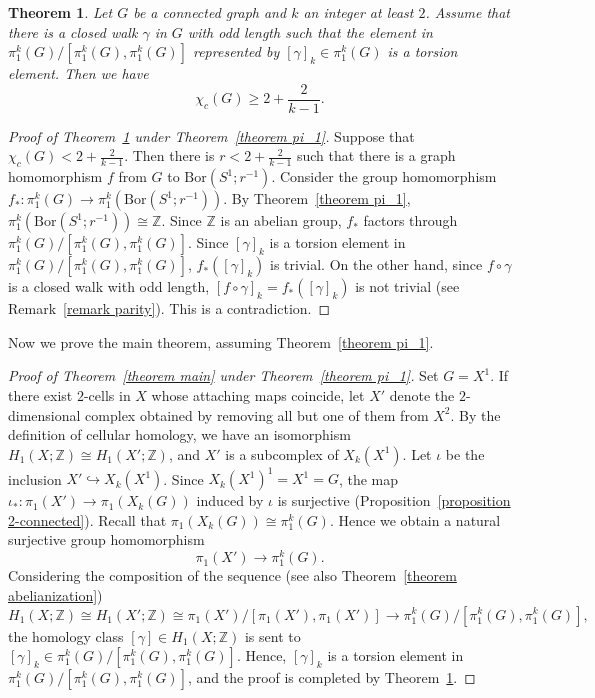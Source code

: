 \documentclass[11pt, amsfonts]{amsart}
\numberwithin{equation}{section}
\newtheorem{theorem}[thm]{Theorem}
\theoremstyle{definition}
\theoremstyle{remark}
\newcommand{\ZZ}{\mathbb{Z}}
\newcommand{\Bor}{\mathrm{Bor}}
\begin{document}
\begin{theorem} \label{theorem circular 1}
Let $G$ be a connected graph and $k$ an integer at least $2$. Assume that there is a closed walk $\gamma$ in $G$ with odd length such that the element in $\pi_1^k(G) / [\pi_1^k(G), \pi_1^k(G)]$ represented by $[\gamma]_k \in \pi_1^k(G)$ is a torsion element. Then we have
\[ \chi_c(G) \ge 2 + \frac{2}{k-1}.\]
\end{theorem}
\begin{proof}[Proof of Theorem~\ref{theorem circular 1} under Theorem~\ref{theorem pi_1}]
Suppose that $\chi_c(G) < 2 + \frac{2}{k-1}$. Then there is $r < 2 + \frac{2}{k-1}$ such that there is a graph homomorphism $f$ from $G$ to $\Bor(S^1 ; r^{-1})$. Consider the group homomorphism $f_* \colon \pi_1^k(G) \to \pi_1^k(\Bor(S^1; r^{-1}))$. By Theorem~\ref{theorem pi_1}, $\pi_1^k(\Bor(S^1; r^{-1})) \cong \ZZ$. Since $\ZZ$ is an abelian group, $f_*$ factors through $\pi_1^k(G) / [\pi_1^k(G), \pi_1^k(G)]$. Since $[\gamma]_k$ is a torsion element in $\pi_1^k(G) / [\pi_1^k(G), \pi_1^k(G)]$, $f_*([\gamma]_k)$ is trivial. On the other hand, since $f \circ \gamma$ is a closed walk with odd length, $[f \circ \gamma]_k = f_* ([\gamma]_k)$ is not trivial (see Remark~\ref{remark parity}). This is a contradiction.
\end{proof}

Now we prove the main theorem, assuming Theorem~\ref{theorem pi_1}.

\begin{proof}[Proof of Theorem~\ref{theorem main} under Theorem~\ref{theorem pi_1}]
Set $G = X^1$. If there exist $2$-cells in $X$ whose attaching maps coincide, let $X'$ denote the $2$-dimensional complex obtained by removing all but one of them from $X^2$. By the definition of cellular homology, we have an isomorphism $H_1(X; \mathbb{Z}) \cong H_1(X'; \mathbb{Z})$, and $X'$ is a subcomplex of $X_k(X^1)$.
Let $\iota$ be the inclusion $X' \hookrightarrow X_k(X^1)$.
Since $X_k(X^1)^1 = X^1 = G$, the map $\iota_* \colon \pi_1(X') \to \pi_1(X_k(G))$ induced by $\iota$ is surjective (Proposition~\ref{proposition 2-connected}).
Recall that $\pi_1(X_k(G)) \cong \pi_1^k(G)$. Hence we obtain a natural surjective group homomorphism
\[ \pi_1(X') \to \pi_1^k(G).\]
Considering the composition of the sequence (see also Theorem~\ref{theorem abelianization})
\[
H_1(X; \mathbb{Z}) \cong H_1(X'; \ZZ) \cong \pi_1(X') / [\pi_1(X'), \pi_1(X')] \to \pi_1^k(G) / [\pi_1^k(G), \pi_1^k(G)],
\]
the homology class $[\gamma] \in H_1(X; \mathbb{Z})$ is sent to \([\gamma]_k \in \pi_1^k(G) / [\pi_1^k(G), \pi_1^k(G)]\).
Hence, \([\gamma]_k\) is a torsion element in \(\pi_1^k(G) / [\pi_1^k(G), \pi_1^k(G)]\), and the proof is completed by Theorem~\ref{theorem circular 1}.
\end{proof}
\end{document}
